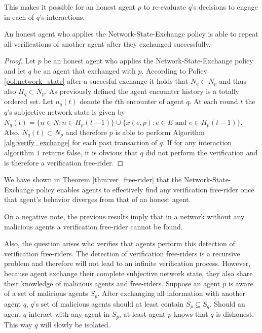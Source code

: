 This makes it possible for an honest agent $p$ to re-evaluate $q$'s decisions to engage in each of $q$'s 
interactions.

\begin{thm}
    \label{thm:ver_free-rider}
    An honest agent who applies the Network-State-Exchange policy is able to repeat all verifications
    of another agent after they exchanged successfully.
\end{thm}
\begin{proof}
    Let $p$ be an honest agent who applies the Network-State-Exchange policy and let $q$ be an agent
    that exchanged with $p$. According to Policy \ref{pol:network_state} after a succesful exchange
    it holds that $N_q \subset N_p$ and thus also $H_q \subset N_p$. As previously defined the agent encounter
    history is a totally ordered set. Let $n_q(t)$ denote the $t$th encounter of agent $q$. At each
    round $t$ the $q$'s subjective network state is given by $N_q(t) = \{ n \in N : n \in H_p(t-1) \} \cup \{ x(e, p) : e \in E \text{ and } e \in H_p(t-1) \}$.
    Also, $N_q(t) \subset N_p$ and therefore $p$ is able to perform Algorithm \ref{alg:verify_exchange}
    for each past transaction of $q$. If for any interaction algorithm $1$ returns false, it is 
    obvious that $q$ did not perform the verification and is therefore a verification free-rider.
\end{proof}

We have shown in Theorem \ref{thm:ver_free-rider} that the Network-State-Exchange policy enables 
agents to effectively find any verification free-rider once that agent's behavior diverges from that
of an honest agent. 

On a negative note, the previous results imply that in a network without any malicious agents a 
verification free-rider cannot be found. 

Also, the question arises who verifies that agents perform this detection of verification 
free-riders. The detection of verification free-riders is a recursive problem and therefore will not
lead to an infinite verification process. However, because agent exchange their complete subjective
network state, they also share their knowledge of malicious agents and free-riders. Suppose an agent
$p$ is aware of a set of malicious agents $S_p$. After exchanging all information with another agent
$q$, $q$'s set of malicious agents should at least contain $S_p \subseteq S_q$. Should an agent $q$ 
interact with any agent in $S_p$, at least agent $p$ knows that $q$ is dishonest. This way $q$ will 
slowly be isolated.

